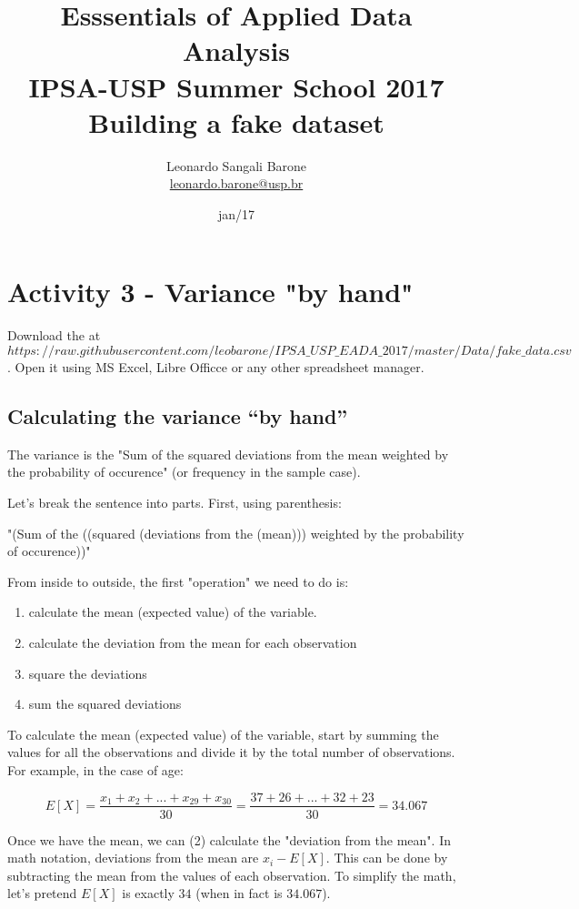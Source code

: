 \documentclass[11pt]{article}
\title{\textbf{Esssentials of Applied Data Analysis\\
				IPSA-USP Summer School 2017}\newline\\
				Building a fake dataset}
\author{Leonardo Sangali Barone\\ \href{leonardo.barone@usp.br}{leonardo.barone@usp.br}}
\date{jan/17}
\begin{document}
\maketitle

\section*{Activity 3 - Variance "by hand"
}


Download the at 
\[https://raw.githubusercontent.com/leobarone/IPSA\_USP\_EADA\_2017/master/Data/fake\_data.csv\]. 
Open it using MS Excel, Libre Officce or any other spreadsheet manager.

\subsection*{Calculating the variance ``by hand''}

The variance is the "Sum of the squared deviations from the mean weighted by the probability of occurence" (or frequency in the sample case).

Let's break the sentence into parts. First, using parenthesis:

"(Sum of the ((squared (deviations from the (mean))) weighted by the probability of occurence))"

From inside to outside, the first "operation" we need to do is:

\begin{enumerate}
		\item calculate the mean (expected value) of the variable.
		\item calculate the deviation from the mean for each observation
		\item square the deviations
		\item sum the squared deviations
\end{enumerate}

To calculate the mean (expected value) of the variable, start by summing the values for all the observations and divide it by the total number of observations. For example, in the case of age:

\[E[X] = \frac{x_1 + x_2 + ... + x_{29} + x_{30}}{30} = \frac{37+26+...+32+23}{30} = 34.067\]

Once we have the mean, we can (2) calculate the "deviation from the mean". In math notation, deviations from the mean are $x_i - E[X]$. This can be done by subtracting the mean from the values of each observation. To simplify the math, let's pretend $E[X]$ is exactly $34$ (when in fact is $34.067$).\\
\end{document}
